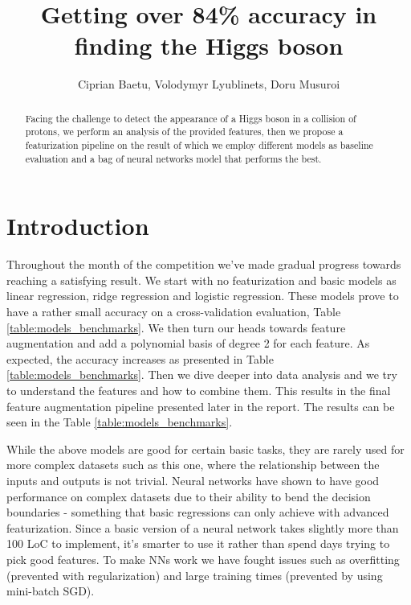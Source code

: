 \documentclass[10pt,conference,compsocconf]{IEEEtran}
\begin{document}
\title{Getting over 84\% accuracy in finding the Higgs boson}

\author{
	Ciprian Baetu, Volodymyr Lyublinets, Doru Musuroi
}

\maketitle

\begin{abstract}
Facing the challenge to detect the appearance of a Higgs boson in a collision of protons, we perform an analysis of the provided features, then we propose a featurization pipeline on the result of which we employ different models as baseline evaluation and a bag of neural networks model that performs the best.
\end{abstract}

\section{Introduction}
Throughout the month of the competition we've made gradual progress towards reaching a satisfying result. 
We start with no featurization and basic models as linear regression, ridge regression and logistic regression. These models prove to have a rather small accuracy on a cross-validation evaluation, Table \ref{table:models_benchmarks}. 
We then turn our heads towards feature augmentation and add a polynomial basis of degree 2 for each feature. As expected, the accuracy increases as presented in Table \ref{table:models_benchmarks}. 
Then we dive deeper into data analysis and we try to understand the features and how to combine them. This results in the final feature augmentation pipeline presented later in the report. The results can be seen in the Table \ref{table:models_benchmarks}. 

While the above models are good for certain basic tasks, they are rarely used for more complex datasets such as this one, where the relationship between the inputs and outputs is not trivial. Neural networks have shown to have good performance on complex datasets due to their ability to bend the decision boundaries - something that basic regressions can only achieve with advanced featurization. Since a basic version of a neural network takes slightly more than 100 LoC to implement, it's smarter to use it rather than spend days trying to pick good features. To make NNs work we have fought issues such as overfitting (prevented with regularization) and large training times (prevented by using mini-batch SGD).
\end{document}
